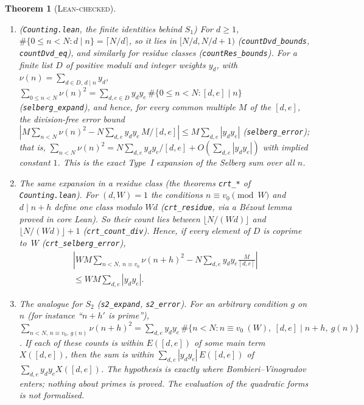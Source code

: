 \documentclass[11pt]{amsart}
\newtheorem{theorem}{Theorem}
\theoremstyle{definition}
\theoremstyle{remark}
\newcommand{\lbl}[1]{\textup{\textsc{#1}}}
\newcommand{\DHL}{\mathrm{DHL}}
\begin{document}
\begin{theorem}[\lbl{Lean-checked}]
\begin{enumerate}
gives the sieve inequality of item~6 and hence $\DHL[k,2]$
(\texttt{sieveInequality\_\allowbreak of\_asymptotics}; for $k=50$,
\texttt{boundedGaps\_246\_\allowbreak of\_asymptotics\_50}). In Maynard's
notation $a/a'\ge I_k(F)$ and $c/c'\le(\theta/2)J_k(F)$, so item~7 with
item~6 is the numerical criterion $\theta J_k(F)/(2I_k(F))>1$; the
asymptotics themselves are a hypothesis.
\item (\texttt{Counting.lean}, the finite identities behind $S_1$) For
$d\ge1$, $\#\{0\le n<N:d\mid n\}=\lceil N/d\rceil$, so it lies in
$[N/d,N/d+1)$ (\texttt{countDvd\_bounds}, \texttt{countDvd\_eq}), and similarly
for residue classes (\texttt{countRes\_bounds}). For a finite list $D$ of positive
moduli and integer weights $y_d$, with
$\nu(n)=\sum_{d\in D,\,d\mid n}y_d$,
$\sum_{0\le n<N}\nu(n)^2=\sum_{d,e\in D}y_dy_e\,\#\{0\le n<N:[d,e]\mid n\}$
(\texttt{selberg\_expand}), and hence, for every common multiple $M$ of the
$[d,e]$, the division-free error bound
$\left|M\sum_{n<N}\nu(n)^2-N\sum_{d,e}y_dy_e\,M/[d,e]\right|\le M\sum_{d,e}|y_dy_e|$
(\texttt{selberg\_error}); that is,
$\sum_{n<N}\nu(n)^2=N\sum_{d,e}y_dy_e/[d,e]+O(\sum_{d,e}|y_dy_e|)$ with
implied constant $1$. This is the exact Type~I expansion of the Selberg sum
over all $n$.
\item The same expansion in a residue class (the theorems
\texttt{crt\_*} of \texttt{Counting.lean}). For $(d,W)=1$ the conditions
$n\equiv v_0\pmod W$ and $d\mid n+h$ define one class modulo $Wd$
(\texttt{crt\_residue}, via a B\'ezout lemma proved in core Lean). So their
count lies between $\lfloor N/(Wd)\rfloor$ and $\lfloor N/(Wd)\rfloor+1$
(\texttt{crt\_count\_div}). Hence, if every element of $D$ is coprime
to~$W$ (\texttt{crt\_selberg\_error}),
\begin{multline*}
\left|WM\sum_{n<N,\ n\equiv v_0}\nu(n+h)^2-N\sum_{d,e}y_dy_e\frac{M}{[d,e]}\right|\\
\le WM\sum_{d,e}|y_dy_e| .
\end{multline*}
\item The analogue for $S_2$ (\texttt{s2\_expand}, \texttt{s2\_error}).
For an arbitrary condition $g$ on $n$ (for instance ``$n+h'$ is prime''),
$\sum_{n<N,\,n\equiv v_0,\,g(n)}\nu(n+h)^2=\sum_{d,e}y_dy_e\,
\#\{n<N:n\equiv v_0\ (W),\ [d,e]\mid n+h,\ g(n)\}$. If each of these counts
is within $E([d,e])$ of some main term $X([d,e])$, then the sum is within
$\sum_{d,e}|y_dy_e|\,E([d,e])$ of $\sum_{d,e}y_dy_eX([d,e])$. The hypothesis
is exactly where Bombieri--Vinogradov enters; nothing about primes is proved.
The evaluation of the quadratic forms is not formalised.

\end{enumerate}
\end{theorem}
\end{document}
